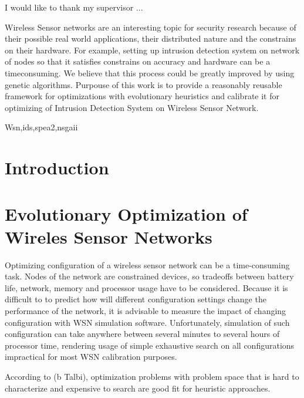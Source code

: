 \documentclass[12pt,oneside,draft]{fithesis2}
\begin{document}
\FrontMatter
\ThesisTitlePage
\begin{ThesisDeclaration}
\DeclarationText
\AdvisorName
\end{ThesisDeclaration}
\begin{ThesisThanks}
I would like to thank my supervisor ...
\end{ThesisThanks}
\begin{ThesisAbstract}
\end{ThesisAbstract}
Wireless Sensor networks are an interesting topic for security research because of their possible real world applications, their distributed nature and the constrains on their hardware. For example, setting up intrusion detection system on network of nodes so that it satisfies constrains on accuracy and hardware can be a timeconsuming.
We believe that this process could be greatly improved by using genetic algorithms.
Purpouse  of this work is to provide a reasonably reusable framework for optimizations with evolutionary heuristics and calibrate it for optimizing of Intrusion Detection System on Wireless Sensor Network. 
\begin{ThesisKeyWords}
Wsn,ids,spea2,nsgaii
\end{ThesisKeyWords}

\tableofcontents %

\MainMatter
\chapter{Introduction}


\chapter{Evolutionary Optimization of Wireles Sensor Networks}
Optimizing configuration of a wireless sensor network can be a time-consuming task. Nodes of the network are constrained devices,
so tradeoffs between battery life, network, memory and processor usage have to be considered. Because it is difficult to to predict how will different configuration settings change the performance of the network, it is advisable to measure the impact of changing configuration with WSN simulation software. Unfortunately, simulation of such configuration can take anywhere between several minutes to several hours of processor time, rendering usage of simple exhaustive search on all configurations impractical for most WSN calibration purposes.

According to (b Talbi), optimization problems with problem space that is hard to characterize and expensive to search are good fit for heuristic approaches.
\end{document}
